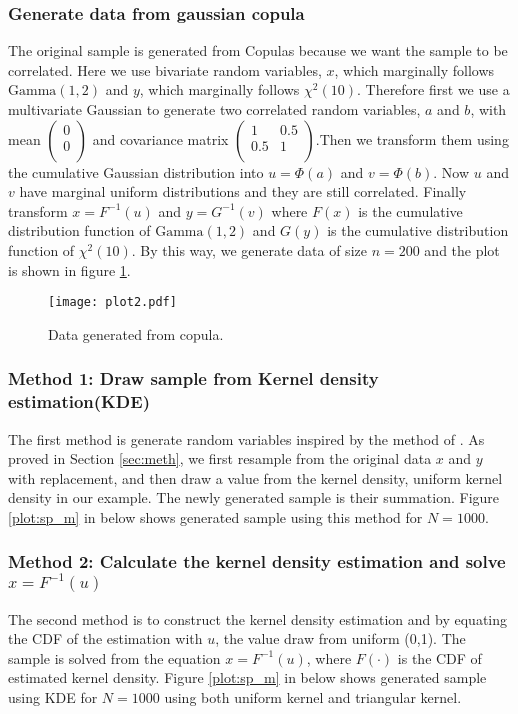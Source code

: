 \documentclass[letterpaper,12pt,hidelinks]{article}
\begin{document}
\subsubsection{Generate data from gaussian copula}
The original sample is generated from Copulas because we want the sample to be correlated. Here we use bivariate random variables, $x$, which marginally follows $\text{Gamma}(1,2)$ and $y$, which marginally follows $\chi^2(10)$. Therefore first we use a multivariate Gaussian to generate two correlated random variables, $a$ and $b$, with mean $\left(\begin{matrix} 0 \\ 0 \\ \end{matrix}\right)$ and covariance matrix $\left(\begin{matrix} 1 & 0.5 \\ 0.5 & 1 \\ \end{matrix}\right)$.Then we transform them using the cumulative Gaussian distribution into $u=\Phi(a)$ and $v=\Phi(b)$. Now $u$ and $v$ have marginal uniform distributions and they are still correlated. Finally transform $x = F^{-1}(u)$ and $y= G^{-1}(v)$ where $F(x)$ is the cumulative distribution function of $\text{Gamma}(1,2)$ and $G(y)$ is the cumulative distribution function of $\chi^2(10)$. By this way, we generate data of size $n = 200$ and the plot is shown in figure \ref{p1}.
\begin{figure}[h]
  \centering
  \texttt{[image: plot2.pdf]}
  \caption{Data generated from copula.}
  \label{p1}
\end{figure}


\subsubsection{Method 1: Draw sample from Kernel density estimation(KDE)}
The first method is generate random variables inspired by the method of \cite{kde}. As proved in Section \ref{sec:meth}, we first resample from the original data $x$ and $y$ with replacement, and then draw a value from the kernel density, uniform kernel density in our example. The newly generated sample is their summation.
Figure \ref{plot:sp_m} in below shows generated sample using this method for $N = 1000$.


\subsubsection{Method 2: Calculate the kernel density estimation and solve $x = F^{-1}(u)$}
The second method is to construct the kernel density estimation and by equating the CDF of the estimation with $u$, the value draw from uniform (0,1). The sample is solved from the equation $x = F^{-1}(u)$, where $F(\cdot)$ is the CDF of estimated kernel density. Figure \ref{plot:sp_m} in below shows generated sample using KDE for $N = 1000$ using both uniform kernel and triangular kernel.
\end{document}

